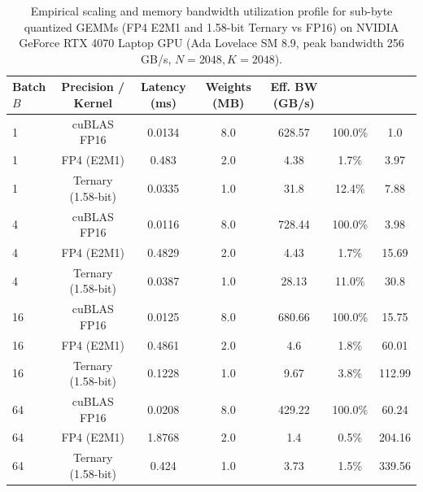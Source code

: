 \documentclass[journal]{IEEEtran}
\begin{document}
\begin{table}[t]
\centering
\small
\begin{tabular}{lcccccc}
\toprule
\textbf{Batch $B$} & \textbf{Precision / Kernel} & \textbf{Latency (ms)} & \textbf{Weights (MB)} & \textbf{Eff. BW (GB/s)} & \textbf{BW Util (\\%
\midrule
1 & cuBLAS FP16 & 0.0134 & 8.0 & 628.57 & 100.0\% & 1.0 \\
1 & FP4 (E2M1) & 0.483 & 2.0 & 4.38 & 1.7\% & 3.97 \\
1 & Ternary (1.58-bit) & 0.0335 & 1.0 & 31.8 & 12.4\% & 7.88 \\
4 & cuBLAS FP16 & 0.0116 & 8.0 & 728.44 & 100.0\% & 3.98 \\
4 & FP4 (E2M1) & 0.4829 & 2.0 & 4.43 & 1.7\% & 15.69 \\
4 & Ternary (1.58-bit) & 0.0387 & 1.0 & 28.13 & 11.0\% & 30.8 \\
16 & cuBLAS FP16 & 0.0125 & 8.0 & 680.66 & 100.0\% & 15.75 \\
16 & FP4 (E2M1) & 0.4861 & 2.0 & 4.6 & 1.8\% & 60.01 \\
16 & Ternary (1.58-bit) & 0.1228 & 1.0 & 9.67 & 3.8\% & 112.99 \\
64 & cuBLAS FP16 & 0.0208 & 8.0 & 429.22 & 100.0\% & 60.24 \\
64 & FP4 (E2M1) & 1.8768 & 2.0 & 1.4 & 0.5\% & 204.16 \\
64 & Ternary (1.58-bit) & 0.424 & 1.0 & 3.73 & 1.5\% & 339.56 \\
\bottomrule
\end{tabular}
\caption{Empirical scaling and memory bandwidth utilization profile for sub-byte quantized GEMMs (FP4 E2M1 and 1.58-bit Ternary vs FP16) on NVIDIA GeForce RTX 4070 Laptop GPU (Ada Lovelace SM 8.9, peak bandwidth 256 GB/s, $N=2048, K=2048$).}
\label{tab:lowbit_gemm_scaling}
\end{table}
\end{document}
